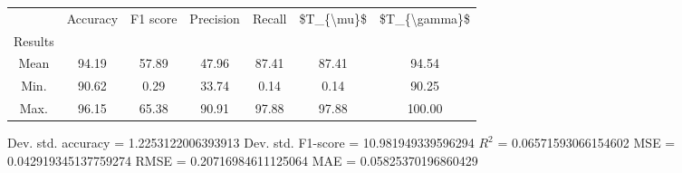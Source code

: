 \begin{tabular}{|c|c|c|c|c|c|c|}
\toprule
{} &  Accuracy &  F1 score &  Precision &  Recall &  \$T\_\{\textbackslash mu\}\$ &  \$T\_\{\textbackslash gamma\}\$ \\
Results &           &           &            &         &            &               \\
\hline
Mean    &     94.19 &     57.89 &      47.96 &   87.41 &      87.41 &         94.54 \\
Min.    &     90.62 &      0.29 &      33.74 &    0.14 &       0.14 &         90.25 \\
Max.    &     96.15 &     65.38 &      90.91 &   97.88 &      97.88 &        100.00 \\
\bottomrule
\end{tabular}

 Dev. std. accuracy = 1.2253122006393913
 Dev. std. F1-score = 10.981949339596294
 $R^2$ = 0.06571593066154602
 MSE = 0.042919345137759274
 RMSE = 0.20716984611125064
 MAE = 0.05825370196860429